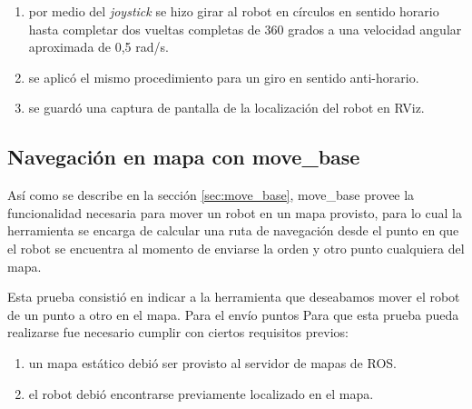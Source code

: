 \begin{enumerate}
    \item por medio del \textit{joystick} se hizo girar al robot en círculos en sentido horario hasta completar dos vueltas completas de 360 grados a una velocidad angular aproximada de 0,5 rad/s.
    \item se aplicó el mismo procedimiento para un giro en sentido anti-horario.
    \item se guardó una captura de pantalla de la localización del robot en RViz.
\end{enumerate}



\subsection{Navegación en mapa con move\_base}

Así como se describe en la sección \ref{sec:move_base}, move\_base provee la funcionalidad necesaria para mover un robot en un mapa provisto, para lo cual la herramienta se encarga de calcular una ruta de navegación desde el punto en que el robot se encuentra al momento de enviarse la orden y otro punto cualquiera del mapa.

Esta prueba consistió en indicar a la herramienta que deseabamos mover el robot de un punto a otro en el mapa. Para el envío puntos  
Para que esta prueba pueda realizarse fue necesario cumplir con ciertos requisitos previos:

\begin{enumerate}
    \item un mapa estático debió ser provisto al servidor de mapas de ROS.
    \item el robot debió encontrarse previamente localizado en el mapa.
\end{enumerate}
